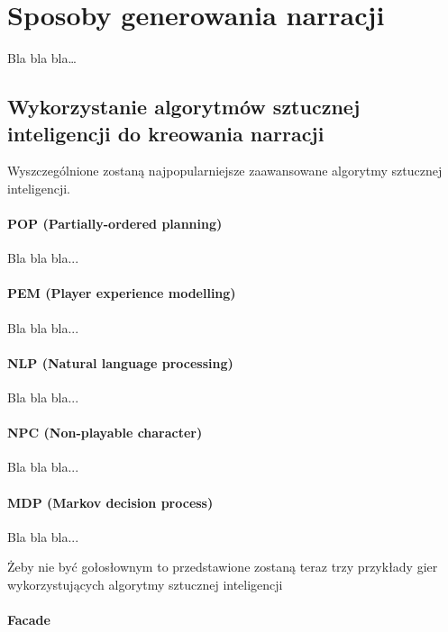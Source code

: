 \chapter{Sposoby generowania narracji}\label{chapter:ch2}

Bla bla bla\dots

\section{Wykorzystanie algorytmów sztucznej inteligencji do kreowania narracji}\label{section:ch2_1}

Wyszczególnione zostaną najpopularniejsze zaawansowane algorytmy sztucznej inteligencji.

\subsubsection*{POP (Partially-ordered planning)}

Bla bla bla...

\subsubsection*{PEM (Player experience modelling)}

Bla bla bla...

\subsubsection*{NLP (Natural language processing)}

Bla bla bla...

\subsubsection*{NPC (Non-playable character)}

Bla bla bla...

\subsubsection*{MDP (Markov decision process)}

Bla bla bla...

Żeby nie być gołosłownym to przedstawione zostaną teraz trzy przykłady gier wykorzystujących
algorytmy sztucznej inteligencji

\subsubsection*{Facade}

